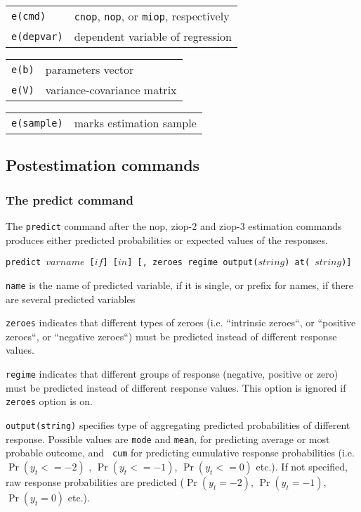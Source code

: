 \documentclass[letterpaper,fleqn,12pt]{article}
\begin{document}
\begin{onehalfspace}
\begin{tabular}{p{3cm}p{12cm}}
\texttt{e(cmd)} & \texttt{cnop}, \texttt{nop}, or \texttt{miop}, respectively
\\ 
\texttt{e(depvar)} & dependent variable of regression%
\end{tabular}


\begin{tabular}{p{3cm}p{12cm}}
\texttt{e(b)} & parameters vector \\ 
\texttt{e(V)} & variance-covariance matrix%
\end{tabular}


\begin{tabular}{p{3cm}p{12cm}}
\texttt{e(sample)} & marks estimation sample%
\end{tabular}

\subsection*{Postestimation commands}

\subsubsection*{The predict command}

The \texttt{predict} command after the nop, ziop-2 and ziop-3 estimation
commands produces either predicted probabilities or expected values of the
responses.

\texttt{predict $varname$ [$if$] [$in$] [, zeroes regime output($string$) at(%
$string$)]}

\texttt{name} is the name of predicted variable, if it is single, or prefix
for names, if there are several predicted variables

\texttt{zeroes} indicates that different types of zeroes (i.e. ``intrinsic
zeroes``, or ``positive zeroes``, or ``negative zeroes``) must be predicted
instead of different response values.

\texttt{regime} indicates that different groups of response (negative,
positive or zero) must be predicted instead of different response values.
This option is ignored if \texttt{zeroes} option is on.

\texttt{output(string)} specifies type of aggregating predicted
probabilities of different response. Possible values are \texttt{mode} and 
\texttt{mean}, for predicting average or most probable outcome, and \texttt{%
cum} for predicting cumulative response probabilities (i.e. $\Pr (y_{t}<=-2)$%
, $\Pr (y_{t}<=-1)$, $\Pr (y_{t}<=0)$ etc.). If not specified, raw response
probabilities are predicted ($\Pr (y_{t}=-2)$, $\Pr (y_{t}=-1)$, $\Pr
(y_{t}=0)$ etc.).


\end{onehalfspace}
\end{document}
